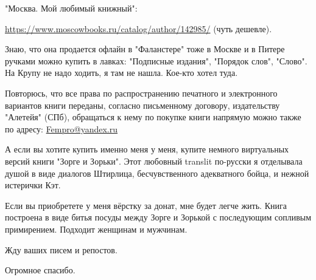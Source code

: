 "Москва. Мой любимый книжный":

\url{https://www.moscowbooks.ru/catalog/author/142985/} (чуть дешевле).

Знаю, что она продается офлайн в "Фаланстере" тоже в Москве и в Питере ручками
можно купить в лавках: "Подписные издания", "Порядок слов", "Слово". На Крупу
не надо ходить, я там не нашла. Кое-кто хотел туда.

Повторюсь, что все права по распространению печатного и электронного вариантов
книги переданы, согласно письменному договору, издательству "Алетейя" (СПб),
обращаться к нему по покупке книги напрямую можно также по адресу:
\url{Fempro@yandex.ru} 

А если вы хотите купить именно меня у меня, купите немного виртуальных версий
книги "Зорге и Зорьки". Этот любовный translit по-русски я отделывала душой в
виде диалогов Штирлица, бесчувственного адекватного бойца, и нежной истерички
Кэт. 

Если вы приобретете у меня вёрстку за донат, мне будет легче жить. Книга
построена в виде битья посуды между Зорге и Зорькой с последующим сопливым
примирением. Подходит женщинам и мужчинам. 

Жду ваших писем и репостов.

Огромное спасибо.
